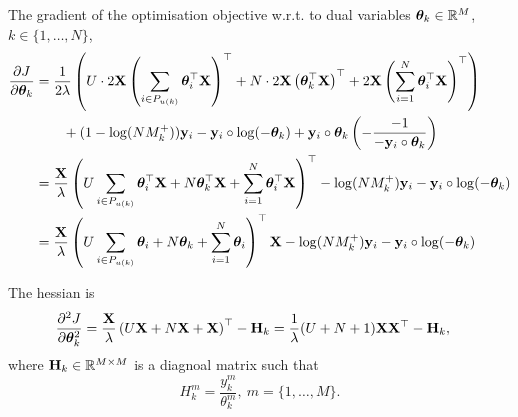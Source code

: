 The gradient of the optimisation objective w.r.t. to dual variables $\bm{\theta}_k \in \mathbb{R}^{M}$, $k \in \{1,\dots,N\}$,
\begin{equation*}
\begin{aligned}
\frac{\partial J}{\partial \bm{\theta}_k}
&= \frac{1}{2 \lambda} \left( U \cdot 2 \mathbf{X} \left(\sum_{i \in P_{u(k)}} \bm{\theta}_i^\top \mathbf{X} \right)^\top 
   + N \cdot 2 \mathbf{X} \left( \bm{\theta}_k^\top \mathbf{X} \right)^\top
   + 2 \mathbf{X} \left(\sum_{i=1}^N \bm{\theta}_i^\top \mathbf{X} \right)^\top \right) \\
& \hspace{2em}
   + (1 - \log(N M_k^+)) \mathbf{y}_i - \mathbf{y}_i \circ \log(-\bm{\theta}_k) + \mathbf{y}_i \circ \bm{\theta}_k \left( -\frac{-1}{-\mathbf{y}_i \circ \bm{\theta}_k} \right) \\
&= \frac{\mathbf{X}}{\lambda} \left( U \sum_{i \in P_{u(k)}} \bm{\theta}_i^\top \mathbf{X} 
   + N \bm{\theta}_k^\top \mathbf{X} 
   + \sum_{i=1}^N \bm{\theta}_i^\top \mathbf{X} \right)^\top
   - \log(N M_k^+) \mathbf{y}_i - \mathbf{y}_i \circ \log(-\bm{\theta}_k) \\
&= \frac{\mathbf{X}}{\lambda} \left( U \sum_{i \in P_{u(k)}} \bm{\theta}_i + N \bm{\theta}_k + \sum_{i=1}^N \bm{\theta}_i \right)^\top \mathbf{X}
   - \log(N M_k^+) \mathbf{y}_i - \mathbf{y}_i \circ \log(-\bm{\theta}_k) \\
\end{aligned}
\end{equation*}

The hessian is
\begin{equation*}
\begin{aligned}
\frac{\partial^2 J}{\partial \bm{\theta}_k^2}
&= \frac{\mathbf{X}}{\lambda} \left( U \mathbf{X} + N \mathbf{X} + \mathbf{X} \right)^\top - \mathbf{H}_k
 = \frac{1}{\lambda} (U + N + 1) \mathbf{X} \mathbf{X}^\top - \mathbf{H}_k,
\end{aligned}
\end{equation*}
where $\mathbf{H}_k \in \mathbb{R}^{M \times M}$ is a diagnoal matrix such that
\begin{equation*}
H_k^m = \frac{y_k^m}{\theta_k^m}, \ m = \{1,\dots,M\}.
\end{equation*}
